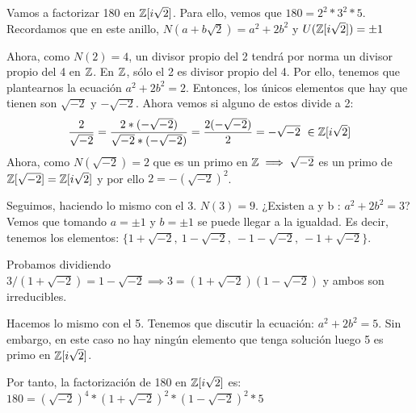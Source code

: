 \begin{ejemplo}[2]
	Vamos a factorizar 180 en $\mathbb{Z}[i\sqrt2]$. Para ello, vemos que $180 = 2^2 * 3^2 * 5$. Recordamos que en este anillo, $N(a+b\sqrt2) = a^2 +2b^2$ y $U(\mathbb{Z}[i\sqrt2]) = \pm 1$

	Ahora, como $N(2) = 4$, un divisor propio del 2 tendrá por norma un divisor propio del 4 en $\mathbb{Z}$. En $\mathbb{Z}$, sólo el 2 es divisor propio del 4. Por ello, tenemos que plantearnos la ecuación $a^2+2b^2 = 2$. Entonces, los únicos elementos que hay que tienen son $\sqrt{-2}$ y $-\sqrt{-2}$.
	Ahora vemos si alguno de estos divide a 2:
	\[
	\frac{2}{\sqrt{-2}} =  \frac{2*(-\sqrt{-2})}{\sqrt{-2}*(-\sqrt{-2})}= \frac{2(-\sqrt{-2})}{2} = -\sqrt{-2} \ \in \mathbb{Z}[i\sqrt2]
	\]
	Ahora, como $N(\sqrt{-2})=2$ que es un primo en $\mathbb{Z} \implies \sqrt{-2}$ es un primo de $\mathbb{Z}[\sqrt{-2}] = \mathbb{Z}[i\sqrt2]$ y por ello $2=-(\sqrt{-2})^2$.

	Seguimos, haciendo lo mismo con el 3. $N(3) = 9$. ¿Existen a y b : $a^2 + 2b^2 = 3$? Vemos que tomando $a=\pm 1$ y $b=\pm1$ se puede llegar a la igualdad. Es decir, tenemos los elementos: $\{1+\sqrt{-2}, \ 1-\sqrt{-2}, \ -1-\sqrt{-2}, \ - 1 + \sqrt{-2}\}$.

	Probamos dividiendo $3/(1+\sqrt{-2}) = 1 - \sqrt{-2}\implies 3 = (1+\sqrt{-2})(1-\sqrt{-2})$ y ambos son irreducibles.

	Hacemos lo mismo con el 5. Tenemos que discutir la ecuación: $a^2+2b^2 = 5$. Sin embargo, en este caso no hay ningún elemento que tenga solución luego 5 es primo en $\mathbb{Z}[i\sqrt2]$.

	Por tanto, la factorización de 180 en $\mathbb{Z}[i\sqrt2]$ es: $180 = (\sqrt{-2})^4*(1+\sqrt{-2})^2*(1-\sqrt{-2})^2*5$
\end{ejemplo}

